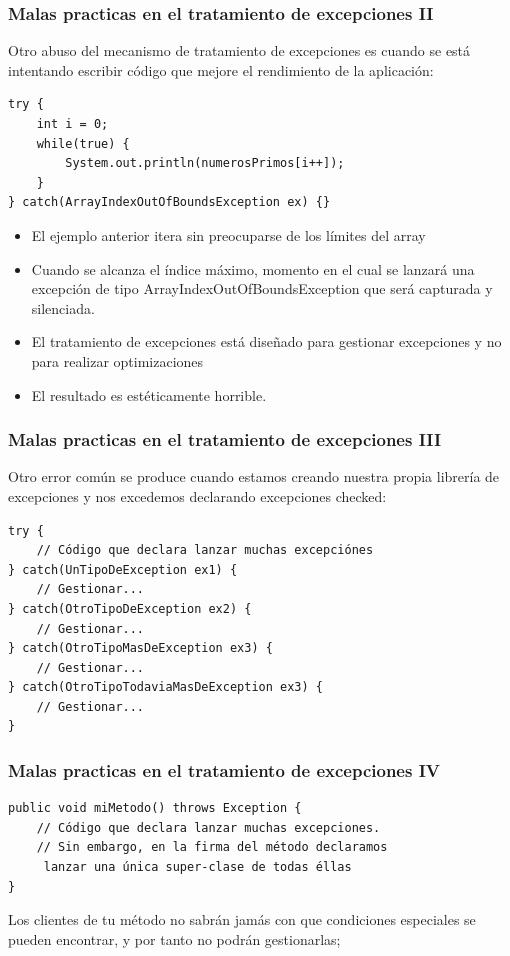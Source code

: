 \documentclass{beamer}
\begin{document}
\begin{frame}[fragile]
\frametitle{Malas practicas en el tratamiento de excepciones II}
Otro abuso del mecanismo de tratamiento de excepciones es cuando se está intentando escribir código que mejore el rendimiento de la aplicación:
\begin{scriptsize}
\begin{verbatim}
try { 
    int i = 0; 
    while(true) { 
        System.out.println(numerosPrimos[i++]); 
    } 
} catch(ArrayIndexOutOfBoundsException ex) {}
\end{verbatim}
\end{scriptsize}
\pause
\begin{itemize}[<+->]
\item El ejemplo anterior itera sin preocuparse de los límites del array
\item Cuando se alcanza el índice máximo, momento en el cual se lanzará una excepción de tipo ArrayIndexOutOfBoundsException que será capturada y silenciada.
\item El tratamiento de excepciones está diseñado para gestionar excepciones y no para realizar optimizaciones 
\item  El resultado es estéticamente horrible.
\end{itemize}
\end{frame}

\begin{frame}[fragile]
\frametitle{Malas practicas en el tratamiento de excepciones III}
Otro error común se produce cuando estamos creando nuestra propia librería de excepciones y nos excedemos declarando excepciones checked:
\begin{scriptsize}
\begin{verbatim}
try { 
    // Código que declara lanzar muchas excepciónes 
} catch(UnTipoDeException ex1) { 
    // Gestionar... 
} catch(OtroTipoDeException ex2) { 
    // Gestionar... 
} catch(OtroTipoMasDeException ex3) { 
    // Gestionar... 
} catch(OtroTipoTodaviaMasDeException ex3) { 
    // Gestionar... 
}
\end{verbatim}
\end{scriptsize}
\end{frame}

\begin{frame}[fragile]
\frametitle{Malas practicas en el tratamiento de excepciones IV}
\begin{scriptsize}
\begin{verbatim}
public void miMetodo() throws Exception { 
    // Código que declara lanzar muchas excepciones. 
    // Sin embargo, en la firma del método declaramos
     lanzar una única super-clase de todas éllas 
}
\end{verbatim}
\end{scriptsize}
Los clientes de tu método no sabrán jamás con que condiciones especiales se pueden encontrar, y por tanto no podrán gestionarlas;
\end{frame}
\end{document}
